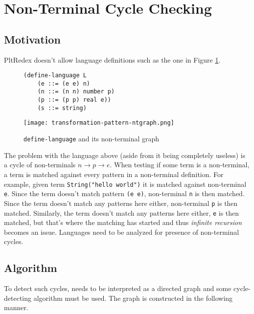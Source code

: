 \section{Non-Terminal Cycle Checking}

\subsection{Motivation}
PltRedex doesn't allow language definitions such as the one in Figure \ref{dl-ntcyclegraph}.

\begin{figure}[H]
\begin{minipage}{0.45\linewidth}
	\centering
\begin{verbatim}
(define-language L
	(e ::= (e e) n)
	(n ::= (n n) number p)
	(p ::= (p p) real e))
	(s ::= string)
\end{verbatim}
\end{minipage}
\begin{minipage}{0.45\linewidth}
	\centering
	\texttt{[image: transformation-pattern-ntgraph.png]}
\end{minipage}
	\caption{\texttt{define-language} and its non-terminal graph}
	\label{dl-ntcyclegraph}
\end{figure}

The problem with the language above (aside from it being completely useless) is a cycle of non-terminals $n \rightarrow p \rightarrow e$. When testing if some term is a non-terminal, a term is matched against every pattern in a non-terminal definition. For example, given term \texttt{String("hello world")} it is matched against non-terminal \texttt{e}. Since  the term doesn't match pattern \texttt{(e e)}, non-terminal \texttt{n} is then matched. Since the term doesn't match any patterns here either, non-terminal \texttt{p} is then matched. Similarly, the term doesn't match any patterns here either, \texttt{e} is then matched, but that's where the matching has started and thus \textit{infinite recursion} becomes an issue. Languages need to be analyzed for presence of non-terminal cycles.

\subsection{Algorithm}
To detect such cycles, \DefineLanguageNoArg needs to be interpreted as a directed graph and some cycle-detecting algorithm must be used. The graph is constructed in the following manner.

